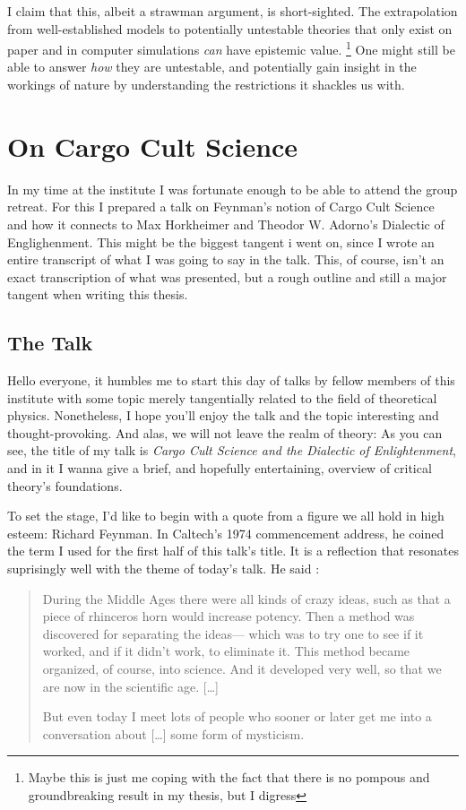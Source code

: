 I claim that this, albeit a strawman argument, is short-sighted. The extrapolation from
well-established models to potentially untestable theories that only exist on
paper and in computer simulations \emph{can} have epistemic value.
\footnote{Maybe this is just me coping with the fact that there is no pompous
and groundbreaking result in my thesis, but I digress}
One might
still be able to answer \emph{how} they are untestable, and potentially gain
insight in the workings of nature by understanding the restrictions it shackles
us with. 

\section*{On Cargo Cult Science}
In my time at the institute I was fortunate enough to be able to attend the
group retreat. For this I prepared a talk on Feynman's notion of Cargo Cult
Science and how it connects to Max Horkheimer and Theodor W. Adorno's Dialectic
of Englighenment. This might be the biggest tangent i went on, since I wrote an
entire transcript of what I was going to say in the talk. This, of course,
isn't an exact transcription of what was presented, but a rough outline and
still a major tangent when writing this thesis.

\subsection*{The Talk}
Hello everyone, it humbles me to start this day of talks by fellow members of
this institute with some topic merely tangentially related to the field of
theoretical physics. Nonetheless, I hope you'll enjoy the talk and the topic interesting
and thought-provoking. 
And alas, we will not leave the realm of theory: As you
can see, the title of my talk is \emph{Cargo Cult Science and the Dialectic of
Enlightenment}, and in it I wanna give a brief, and hopefully entertaining,
overview of critical theory's foundations.

To set the stage, I’d like to begin with a quote from a figure we all hold in
high esteem: Richard Feynman. In Caltech’s 1974 commencement address, he coined
the term I used for the first half of this talk's title. It is
a reflection that resonates suprisingly well with the theme of today’s talk. He
said \cite{feynmanCargoCultScience}:
\blockquote{
  During the Middle Ages there were all kinds of crazy ideas, such as that a
  piece of rhinceros horn would increase potency. Then a method was discovered
  for separating the ideas--- which was to try one to see if it worked, and if
  it didn't work, to eliminate it. This method became organized, of course,
  into science. And it developed very well, so that we are now in the
  scientific age. [\ldots]

  But even today I meet lots of people who sooner or later get me into a
  conversation about [\ldots] some form of mysticism.
}

